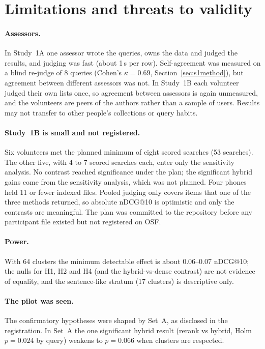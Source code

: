 \documentclass[pdflatex,sn-basic,Numbered]{sn-jnl}
\makeatletter
\newcommand{\ndcg}{nDCG@10}
\makeatother
\begin{document}
\section{Limitations and threats to validity}\label{sec:limits}

\paragraph{Assessors.} In Study~1A one assessor wrote the queries, owns the data and judged the results, and judging was fast (about 1\,s per row). Self-agreement was measured on a blind re-judge of 8 queries (Cohen's $\kappa=0.69$, Section~\ref{sec:s1method}), but agreement between different assessors was not. In Study~1B each volunteer judged their own lists once, so agreement between assessors is again unmeasured, and the volunteers are peers of the authors rather than a sample of users. Results may not transfer to other people's collections or query habits.

\paragraph{Study~1B is small and not registered.} Six volunteers met the planned minimum of eight scored searches (53 searches). The other five, with 4 to 7 scored searches each, enter only the sensitivity analysis. No contrast reached significance under the plan; the significant hybrid gains come from the sensitivity analysis, which was not planned. Four phones held 11 or fewer indexed files. Pooled judging only covers items that one of the three methods returned, so absolute \ndcg{} is optimistic and only the contrasts are meaningful. The plan was committed to the repository before any participant file existed but not registered on OSF.

\paragraph{Power.} With 64 clusters the minimum detectable effect is about 0.06--0.07 \ndcg{}; the nulls for H1, H2 and H4 (and the hybrid-vs-dense contrast) are not evidence of equality, and the sentence-like stratum (17 clusters) is descriptive only.

\paragraph{The pilot was seen.} The confirmatory hypotheses were shaped by Set~A, as disclosed in the registration. In Set~A the one significant hybrid result (rerank vs hybrid, Holm $p=0.024$ by query) weakens to $p=0.066$ when clusters are respected.
\end{document}
